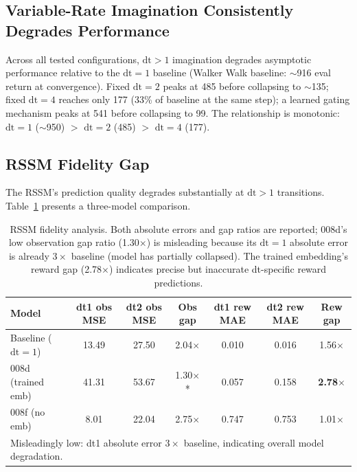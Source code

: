 \documentclass[10pt,letterpaper]{article}
\begin{document}
\subsection{Variable-Rate Imagination Consistently Degrades Performance}

Across all tested configurations, $\mathrm{dt}>1$ imagination degrades asymptotic performance relative to the $\mathrm{dt}=1$ baseline (Walker Walk baseline: $\sim$916 eval return at convergence).
Fixed $\mathrm{dt}=2$ peaks at 485 before collapsing to $\sim$135; fixed $\mathrm{dt}=4$ reaches only 177 (33\% of baseline at the same step); a learned gating mechanism peaks at 541 before collapsing to 99.
The relationship is monotonic: $\mathrm{dt}=1$ ($\sim$950) $>$ $\mathrm{dt}=2$ (485) $>$ $\mathrm{dt}=4$ (177).

\subsection{RSSM Fidelity Gap}

The RSSM's prediction quality degrades substantially at $\mathrm{dt}>1$ transitions.
Table~\ref{tab:rssm_fidelity} presents a three-model comparison.

\begin{table}[h]
\centering
\caption{RSSM fidelity analysis. Both absolute errors and gap ratios are reported; 008d's low observation gap ratio (1.30$\times$) is misleading because its $\mathrm{dt}=1$ absolute error is already $3\times$ baseline (model has partially collapsed). The trained embedding's reward gap (2.78$\times$) indicates precise but inaccurate dt-specific reward predictions.}
\label{tab:rssm_fidelity}
\small
\begin{tabular}{lcccccc}
\toprule
Model & dt1 obs MSE & dt2 obs MSE & Obs gap & dt1 rew MAE & dt2 rew MAE & Rew gap \\
\midrule
Baseline ($\mathrm{dt}=1$) & 13.49 & 27.50 & 2.04$\times$ & 0.010 & 0.016 & 1.56$\times$ \\
008d (trained emb) & 41.31 & 53.67 & 1.30$\times$* & 0.057 & 0.158 & \textbf{2.78$\times$} \\
008f (no emb) & 8.01 & 22.04 & 2.75$\times$ & 0.747 & 0.753 & 1.01$\times$ \\
\bottomrule
\multicolumn{7}{l}{\footnotesize *Misleadingly low: dt1 absolute error $3\times$ baseline, indicating overall model degradation.}
\end{tabular}
\end{table}
\end{document}
